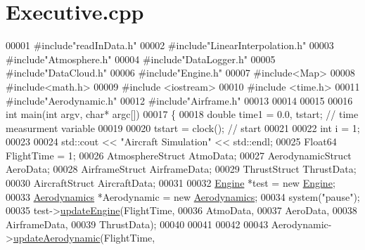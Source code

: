 \hypertarget{_executive_8cpp_source}{}\section{Executive.\+cpp}
\label{_executive_8cpp_source}

\begin{DoxyCode}
00001 \textcolor{preprocessor}{#include"readInData.h"}
00002 \textcolor{preprocessor}{#include"LinearInterpolation.h"}
00003 \textcolor{preprocessor}{#include"Atmosphere.h"}
00004 \textcolor{preprocessor}{#include"DataLogger.h"}
00005 \textcolor{preprocessor}{#include"DataCloud.h"}
00006 \textcolor{preprocessor}{#include"Engine.h"}
00007 \textcolor{preprocessor}{#include<Map>}
00008 \textcolor{preprocessor}{#include<math.h>}
00009 \textcolor{preprocessor}{#include <iostream>}
00010 \textcolor{preprocessor}{#include <time.h>} 
00011 \textcolor{preprocessor}{#include"Aerodynamic.h"}
00012 \textcolor{preprocessor}{#include"Airframe.h"}
00013 
00014 
00015 
00016 \textcolor{keywordtype}{int} main(\textcolor{keywordtype}{int} argv, \textcolor{keywordtype}{char}* argc[])
00017 \{
00018     \textcolor{keywordtype}{double} time1 = 0.0, tstart;      \textcolor{comment}{// time measurment variable}
00019 
00020         tstart = clock();              \textcolor{comment}{// start }
00021 
00022         \textcolor{keywordtype}{int} i = 1;
00023 
00024         std::cout << \textcolor{stringliteral}{"Aircraft Simulation"} << std::endl;
00025         Float64 FlightTime = 1;
00026         AtmosphereStruct  AtmoData;
00027         AerodynamicStruct  AeroData;
00028         AirframeStruct  AirframeData;
00029         ThrustStruct  ThrustData;
00030         AircraftStruct AircraftData;
00031 
00032         \hyperlink{group___engine_class_engine}{Engine} *test = \textcolor{keyword}{new} \hyperlink{group___engine_class_engine}{Engine};
00033         \hyperlink{group___aerodynamic_class_aerodynamics}{Aerodynamics} *Aerodynamic = \textcolor{keyword}{new} \hyperlink{group___aerodynamic_class_aerodynamics}{Aerodynamics};
00034         system(\textcolor{stringliteral}{"pause"});
00035         test->\hyperlink{group___engine_a9e16100ffd33cf8ec632257795c03865}{updateEngine}(FlightTime,
00036                         AtmoData,
00037                         AeroData,
00038                         AirframeData,
00039                         ThrustData);
00040 
00041         
00042 
00043         Aerodynamic->\hyperlink{group___aerodynamic_adf6047b063022ff3b689e269d2b35863}{updateAerodynamic}(FlightTime,

\end{DoxyCode}
